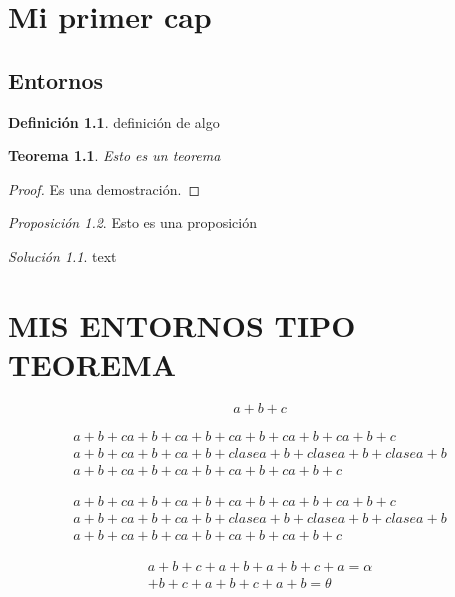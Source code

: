 \documentclass[a4paper]{report}
\numberwithin{equation}{section}
\theoremstyle{definition}
\newtheorem{defi}{Definición}[chapter]
\theoremstyle{plain}
\newtheorem{teo}{Teorema}[section] %
\theoremstyle{remark}
\newtheorem{prop}[teo]{Proposición}%
\newtheorem*{sol}{Solución} %
\begin{document}
\chapter{Mi primer cap}

\section{Entornos}

\begin{defi}
	definición de algo
\end{defi}

\addtocounter{teo}{3}

\begin{teo}
	Esto es un teorema
\end{teo}

\begin{proof}
Es una demostración.
\end{proof}

\begin{prop}
Esto es una proposición

\begin{sol}
text
\end{sol}
\end{prop}



\chapter{MIS ENTORNOS TIPO TEOREMA}



\newpage

\begin{equation*}
a+b+c
\end{equation*}

\begin{multline}
a+b+c a+b+c a+b+c a+b+c a+b+c a+b+c \\
a+b+c a+b+c a+b+clasea+b+clasea+b+clasea+b\\
a+b+c a+b+c a+b+c a+b+c a+b+c 
\end{multline}

\begin{multline*}
a+b+c a+b+c a+b+c a+b+c a+b+c a+b+c \\
a+b+c a+b+c a+b+clasea+b+clasea+b+clasea+b\\
a+b+c a+b+c a+b+c a+b+c a+b+c 
\end{multline*}

\begin{equation}
\begin{split}
a+b+c+a+b+a+b+c+a=\alpha\\
+b+c+a+b+c+a+b=\theta%
\end{split}
\end{equation}
\end{document}
